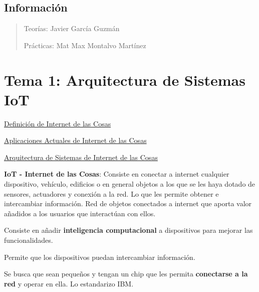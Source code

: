 \documentclass[12pt]{report} %
\begin{document}
\listoffigures
\thispagestyle{fancy}

\listoftables
\thispagestyle{fancy}

\clearpage
{} %




\section{Información}

\begin{quote}
Teorías: Javier García Guzmán

Prácticas: Mat Max Montalvo Martínez
\end{quote}

\chapter{Tema 1: Arquitectura de Sistemas
IoT}

\href{https://learning.oreilly.com/library/view/internet-of-things/9781788470599/a7f866bd-4ac8-47f3-a175-0f10d91a5ce2.xhtml}{Definición
de Internet de las Cosas}

\href{https://learning.oreilly.com/library/view/internet-of-things/9781119456742/part04.xhtml\#part}{Aplicaciones
Actuales de Internet de las Cosas}

\href{https://learning.oreilly.com/library/view/build-your-own/9781484244982/html/474034_1_En_2_Chapter.xhtml}{Arquitectura
de Sistemas de Internet de las Cosas}

\textbf{IoT - Internet de las Cosas}: Consiste en conectar a internet
cualquier dispositivo, vehículo, edificios o en general objetos a los
que se les haya dotado de sensores, actuadores y conexión a la red. Lo
que les permite obtener e intercambiar información. Red de objetos
conectados a internet que aporta valor añadidos a los usuarios que
interactúan con ellos.

Consiste en añadir \textbf{inteligencia computacional} a dispositivos
para mejorar las funcionalidades.

Permite que los dispositivos puedan intercambiar información.

Se busca que sean pequeños y tengan un chip que les permita
\textbf{conectarse a la red} y operar en ella. Lo estandarizo IBM.
\end{document}
